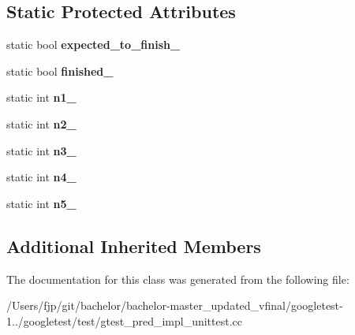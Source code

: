 \subsection*{Static Protected Attributes}
\begin{DoxyCompactItemize}
\item 
\mbox{\label{class_predicate5_test_aa502b7a330cc5c64785ff59aad3ef180}} 
static bool {\bfseries expected\+\_\+to\+\_\+finish\+\_\+}
\item 
\mbox{\label{class_predicate5_test_a5003aada64accf06cdb28b1ff1797353}} 
static bool {\bfseries finished\+\_\+}
\item 
\mbox{\label{class_predicate5_test_a356c8e361185b234a417ed895eb14e38}} 
static int {\bfseries n1\+\_\+}
\item 
\mbox{\label{class_predicate5_test_a5bf48ba65b7baf20abe1d2af90779ce0}} 
static int {\bfseries n2\+\_\+}
\item 
\mbox{\label{class_predicate5_test_a63723efb915dbf418c31b97b64dabc0e}} 
static int {\bfseries n3\+\_\+}
\item 
\mbox{\label{class_predicate5_test_a5d66aa58badddc8d3d8070a93c0558d6}} 
static int {\bfseries n4\+\_\+}
\item 
\mbox{\label{class_predicate5_test_a96badba6366235a2771b27ea014bd9ce}} 
static int {\bfseries n5\+\_\+}
\end{DoxyCompactItemize}
\subsection*{Additional Inherited Members}


The documentation for this class was generated from the following file\+:\begin{DoxyCompactItemize}
\item 
/\+Users/fjp/git/bachelor/bachelor-\/master\+\_\+updated\+\_\+vfinal/googletest-\/1../googletest/test/gtest\+\_\+pred\+\_\+impl\+\_\+unittest.\+cc\end{DoxyCompactItemize}
